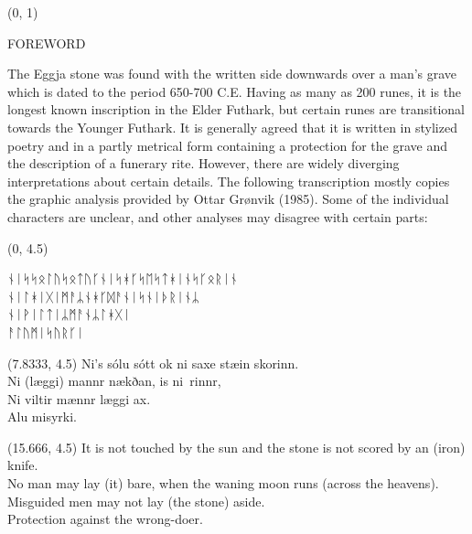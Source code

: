 \documentclass[11pt]{article}
\begin{document}
\begin{textblock}{23}(0, 1)
\begin{center}
\huge FOREWORD
\end{center}
\end{textblock}

\vspace*{0.25\baselineskip}

\begingroup

\begin{center}
The Eggja stone was found with the written side downwards over a man's grave which is dated to the period 650-700 C.E. Having as many as 200 runes, it is the longest known inscription in the Elder Futhark, but certain runes are transitional towards the Younger Futhark. It is generally agreed that it is written in stylized poetry and in a partly metrical form containing a protection for the grave and the description of a funerary rite. However, there are widely diverging interpretations about certain details. The following transcription mostly copies the graphic analysis provided by Ottar Grønvik (1985). Some of the individual characters are unclear, and other analyses may disagree with certain parts:
\end{center}

\begin{textblock}{7.333}(0, 4.5)

\setmainfont{Noto Sans Runic}
ᚾᛁᛋᛋᛟᛚᚢᛋᛟᛏᚢᚴᚾᛁᛋᚼᚴᛋᛖᛋᛏᚼᛁᚾᛋᚴᛟᚱᛁᚾ \\
\hfill \break
ᚾᛁᛚᚼᛁᚷᛁᛗᚨᛦᚾᚼᚴᛞᚨᚾᛁᛋᚾᛁᚦᚱᛁᚾᛦ\\
\hfill \break
ᚾᛁᚹᛁᛚᛏᛁᛦᛗᚨᚾᛦᛚᚼᚷᛁ\\
  \hfill \break
ᚨᛚᚢᛗᛁᛋᚢᚱᚴᛁ\\
\rightskip\leftskip
\phantom{text} \hfill

\end{textblock}

\begin{textblock}{7.333}(7.8333, 4.5)
\setmainfont{Bell MT}
Ni's sólu sótt ok ni saxe stæin skorinn. \\
\hfill \break
Ni (læggi) mannr nækðan, is ni\Thorn \ rinnr, \\
\hfill \break
Ni viltir mænnr læggi ax. \\
\hfill \break
Alu misyrki. \\
\end{textblock}

\begin{textblock}{7.333}(15.666, 4.5)
It is not touched by the sun and the stone is not scored by an (iron) knife. \\
No man may lay (it) bare, when the waning moon runs (across the heavens). \\
Misguided men may not lay (the stone) aside. \\
\hfill \break
Protection against the wrong-doer.
\end{textblock}
\end{document}
